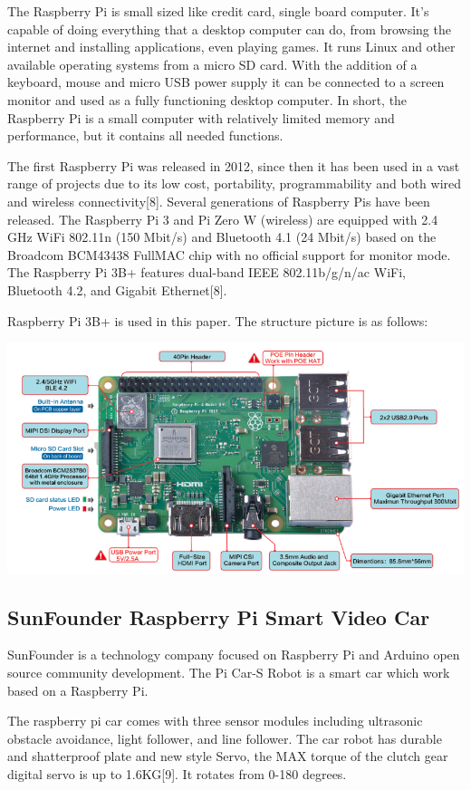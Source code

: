\documentclass{mproj}
\begin{document}
The Raspberry Pi is small sized like credit card, single board computer. It’s capable of doing everything that a desktop computer can do, from browsing the internet and installing applications, even playing games. It runs Linux and other available operating systems from a micro SD card. With the addition of a keyboard, mouse and micro USB power supply it can be connected to a screen monitor and used as a fully functioning desktop computer. In short, the Raspberry Pi is a small computer with relatively limited memory and performance, but it contains all needed functions.  

The first Raspberry Pi was released in 2012, since then it has been used in a vast range of projects due to its low cost, portability, programmability and both wired and wireless connectivity[8]. Several generations of Raspberry Pis have been released. The Raspberry Pi 3 and Pi Zero W (wireless) are equipped with 2.4 GHz WiFi 802.11n (150 Mbit/s) and Bluetooth 4.1 (24 Mbit/s) based on the Broadcom BCM43438 FullMAC chip with no official support for monitor mode. The Raspberry Pi 3B+ features dual-band IEEE 802.11b/g/n/ac WiFi, Bluetooth 4.2, and Gigabit Ethernet[8].

Raspberry Pi 3B+ is used in this paper. The structure picture is as follows:

\includegraphics[width = .9\textwidth]{212.png}

\subsection{SunFounder Raspberry Pi Smart Video Car}

SunFounder is a technology company focused on Raspberry Pi and Arduino open source
community development. The Pi Car-S Robot is a smart car which work based on a Raspberry Pi.

The raspberry pi car comes with three sensor modules including ultrasonic obstacle avoidance, light follower, and line follower. The car robot has durable and shatterproof plate and new style Servo, the MAX torque of the clutch gear digital servo is up to 1.6KG[9]. It rotates from 0-180 degrees.
\end{document}
